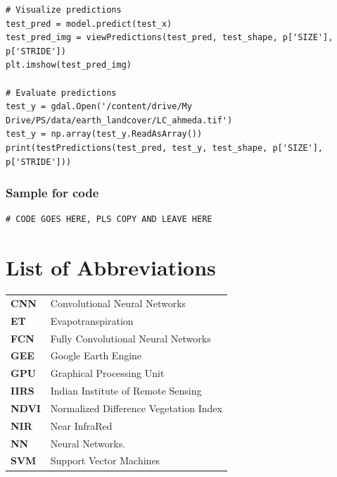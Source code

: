 \documentclass[12pt, a4paper]{report}
\begin{document}
\begin{verbatim}
# Visualize predictions
test_pred = model.predict(test_x)
test_pred_img = viewPredictions(test_pred, test_shape, p['SIZE'], p['STRIDE'])
plt.imshow(test_pred_img)

# Evaluate predictions
test_y = gdal.Open('/content/drive/My Drive/PS/data/earth_landcover/LC_ahmeda.tif')
test_y = np.array(test_y.ReadAsArray())
print(testPredictions(test_pred, test_y, test_shape, p['SIZE'], p['STRIDE']))
\end{verbatim}

\subsubsection*{Sample for code}
\begin{verbatim}
# CODE GOES HERE, PLS COPY AND LEAVE HERE
\end{verbatim}


\printbibliography[heading=bibintoc, title={References}]

\setcounter{secnumdepth}{0}
\section*{List of Abbreviations}
\vspace*{0.5cm}
\begin{tabular}{p{} p{}}
\textbf{CNN} & Convolutional Neural Networks\\
\textbf{ET} & Evapotranspiration\\
\textbf{FCN} & Fully Convolutional Neural Networks\\
\textbf{GEE} & Google Earth Engine\\
\textbf{GPU} & Graphical Processing Unit\\
\textbf{IIRS} & Indian Institute of Remote Sensing\\
\textbf{NDVI} & Normalized Difference Vegetation Index\\
\textbf{NIR} & Near InfraRed\\
\textbf{NN} & Neural Networks.\\
\textbf{SVM} & Support Vector Machines\\
\end{tabular}
\vspace*{1cm}

\end{document}
